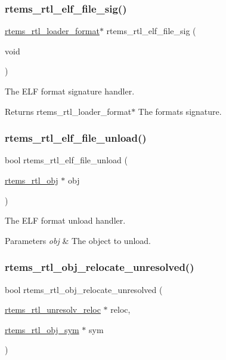 \subsubsection{\texorpdfstring{rtems\_rtl\_elf\_file\_sig()}{rtems\_rtl\_elf\_file\_sig()}}
{\footnotesize\ttfamily \mbox{\hyperlink{structrtems__rtl__loader__format}{rtems\+\_\+rtl\+\_\+loader\+\_\+format}}$\ast$ rtems\+\_\+rtl\+\_\+elf\+\_\+file\+\_\+sig (\begin{DoxyParamCaption}\item[{void}]{ }\end{DoxyParamCaption})}

The E\+LF format signature handler.

\begin{DoxyReturn}{Returns}
rtems\+\_\+rtl\+\_\+loader\+\_\+format$\ast$ The format\textquotesingle{}s signature. 
\end{DoxyReturn}
\mbox{\label{rtl-elf_8c_a11980d1727cffdcc360b8f2d02e836df}} 
\subsubsection{\texorpdfstring{rtems\_rtl\_elf\_file\_unload()}{rtems\_rtl\_elf\_file\_unload()}}
{\footnotesize\ttfamily bool rtems\+\_\+rtl\+\_\+elf\+\_\+file\+\_\+unload (\begin{DoxyParamCaption}\item[{\mbox{\hyperlink{structrtems__rtl__obj}{rtems\+\_\+rtl\+\_\+obj}} $\ast$}]{obj }\end{DoxyParamCaption})}

The E\+LF format unload handler.


\begin{DoxyParams}{Parameters}
{\em obj} & The object to unload. \\
\hline
\end{DoxyParams}
\mbox{\label{rtl-elf_8c_ad6bfd56d63e3cf2562d48a39b7fffc24}} 
\subsubsection{\texorpdfstring{rtems\_rtl\_obj\_relocate\_unresolved()}{rtems\_rtl\_obj\_relocate\_unresolved()}}
{\footnotesize\ttfamily bool rtems\+\_\+rtl\+\_\+obj\+\_\+relocate\+\_\+unresolved (\begin{DoxyParamCaption}\item[{\mbox{\hyperlink{structrtems__rtl__unresolv__reloc}{rtems\+\_\+rtl\+\_\+unresolv\+\_\+reloc}} $\ast$}]{reloc,  }\item[{\mbox{\hyperlink{structrtems__rtl__obj__sym}{rtems\+\_\+rtl\+\_\+obj\+\_\+sym}} $\ast$}]{sym }\end{DoxyParamCaption})}


